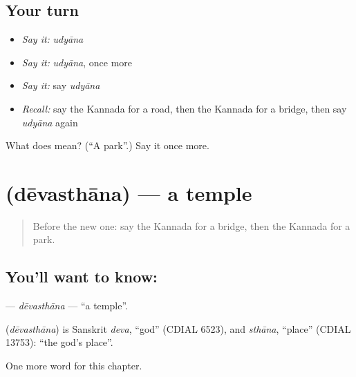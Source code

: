 \subsection*{Your turn}
\begin{itemize}
\raggedright
  \item \emph{Say it:} \emph{udyāna}
  \item \emph{Say it:} \emph{udyāna}, once more
  \item \emph{Say it:} say \emph{udyāna}
  \item \emph{Recall:} say the Kannada for a road, then the Kannada for a bridge, then say \emph{udyāna} again
\end{itemize}

\begin{tcolorbox}[breakable,colback=teal!4,colframe=teal!35!black,title={Before you move on}]
What does  mean? (\textquotedblleft{}A park\textquotedblright{}.) Say it once more.
\end{tcolorbox}
\section[\texorpdfstring{\kn{ದೇವಸ್ಥಾನ} (dēvasthāna)}{ದೇವಸ್ಥಾನ (dēvasthāna)}]{ (dēvasthāna) — a temple}

\label{lesson:KA-C109-devasthana}



\begin{quote}
Before the new one: say the Kannada for a bridge, then the Kannada for a park.
\end{quote}

\subsection*{You'll want to know: }
\textbf{} — \emph{dēvasthāna} — \textquotedblleft{}a temple\textquotedblright{}.

\begin{cousinweb}
\textbf{} (\emph{dēvasthāna}) is Sanskrit \emph{deva}, \textquotedblleft{}god\textquotedblright{} (CDIAL 6523), and \emph{sthāna}, \textquotedblleft{}place\textquotedblright{} (CDIAL 13753): \textquotedblleft{}the god's place\textquotedblright{}.
\end{cousinweb}

\begin{grammarlens}[title={What you've built}]
One more word for this chapter.
\end{grammarlens}

